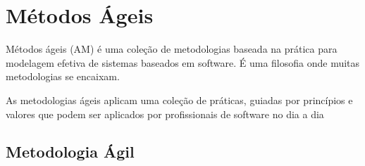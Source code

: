 %
%


\section{Métodos Ágeis}
\label{sec-metedos-ageis}

Métodos ágeis (AM) é uma coleção de metodologias baseada na prática para 
modelagem efetiva de sistemas baseados em software. É uma filosofia onde muitas metodologias se encaixam.

%
As metodologias ágeis aplicam uma coleção de práticas, guiadas por princípios e valores que podem ser aplicados por profissionais de software no dia a dia~\cite{}%

\subsection{Metodologia Ágil}
\label{metodologia-agil}

